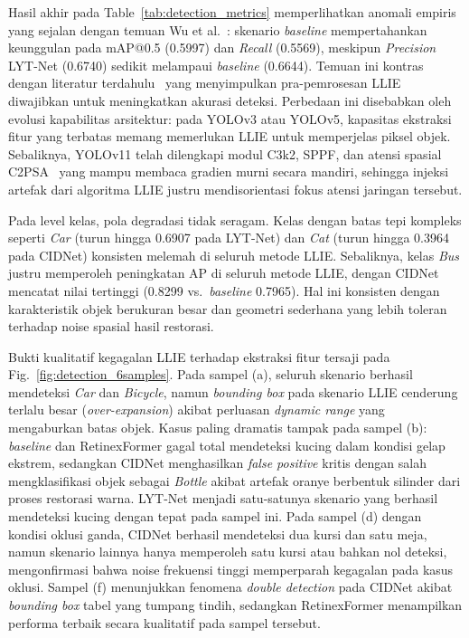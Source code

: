 \documentclass[conference]{IEEEtran}
\begin{document}
Hasil akhir pada Table~\ref{tab:detection_metrics} memperlihatkan anomali empiris yang sejalan dengan temuan Wu et al.~\cite{wu2024llieeffect}: skenario \textit{baseline} mempertahankan keunggulan pada mAP@0.5 (0.5997) dan \textit{Recall} (0.5569), meskipun \textit{Precision} LYT-Net (0.6740) sedikit melampaui \textit{baseline} (0.6644). Temuan ini kontras dengan literatur terdahulu~\cite{wang2023yolov5lowlight,shovo2024lowlight} yang menyimpulkan pra-pemrosesan LLIE diwajibkan untuk meningkatkan akurasi deteksi. Perbedaan ini disebabkan oleh evolusi kapabilitas arsitektur: pada YOLOv3 atau YOLOv5, kapasitas ekstraksi fitur yang terbatas memang memerlukan LLIE untuk memperjelas piksel objek. Sebaliknya, YOLOv11 telah dilengkapi modul C3k2, SPPF, dan atensi spasial C2PSA~\cite{khanam2024yolov11} yang mampu membaca gradien murni secara mandiri, sehingga injeksi artefak dari algoritma LLIE justru mendisorientasi fokus atensi jaringan tersebut.
 
Pada level kelas, pola degradasi tidak seragam. Kelas dengan batas tepi kompleks seperti \textit{Car} (turun hingga 0.6907 pada LYT-Net) dan \textit{Cat} (turun hingga 0.3964 pada CIDNet) konsisten melemah di seluruh metode LLIE. Sebaliknya, kelas \textit{Bus} justru memperoleh peningkatan AP di seluruh metode LLIE, dengan CIDNet mencatat nilai tertinggi (0.8299 vs.\ \textit{baseline} 0.7965). Hal ini konsisten dengan karakteristik objek berukuran besar dan geometri sederhana yang lebih toleran terhadap noise spasial hasil restorasi.
 
Bukti kualitatif kegagalan LLIE terhadap ekstraksi fitur tersaji pada Fig.~\ref{fig:detection_6samples}. Pada sampel (a), seluruh skenario berhasil mendeteksi \textit{Car} dan \textit{Bicycle}, namun \textit{bounding box} pada skenario LLIE cenderung terlalu besar (\textit{over-expansion}) akibat perluasan \textit{dynamic range} yang mengaburkan batas objek. Kasus paling dramatis tampak pada sampel (b): \textit{baseline} dan RetinexFormer gagal total mendeteksi kucing dalam kondisi gelap ekstrem, sedangkan CIDNet menghasilkan \textit{false positive} kritis dengan salah mengklasifikasi objek sebagai \textit{Bottle} akibat artefak oranye berbentuk silinder dari proses restorasi warna. LYT-Net menjadi satu-satunya skenario yang berhasil mendeteksi kucing dengan tepat pada sampel ini. Pada sampel (d) dengan kondisi oklusi ganda, CIDNet berhasil mendeteksi dua kursi dan satu meja, namun skenario lainnya hanya memperoleh satu kursi atau bahkan nol deteksi, mengonfirmasi bahwa noise frekuensi tinggi memperparah kegagalan pada kasus oklusi. Sampel (f) menunjukkan fenomena \textit{double detection} pada CIDNet akibat \textit{bounding box} tabel yang tumpang tindih, sedangkan RetinexFormer menampilkan performa terbaik secara kualitatif pada sampel tersebut.
\end{document}
